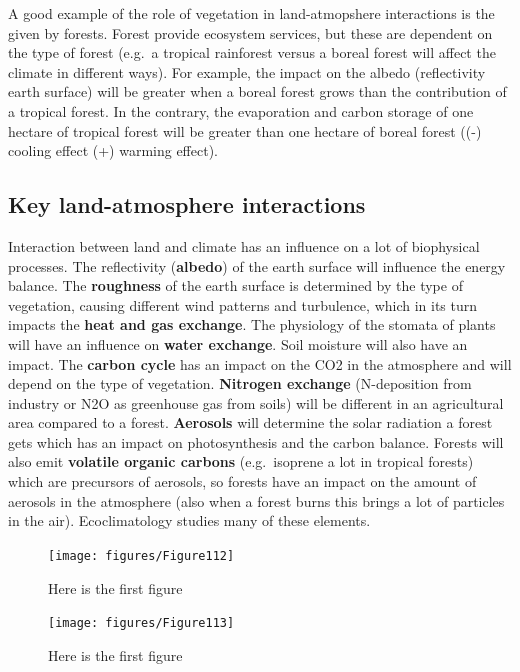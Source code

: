 \documentclass[oneside]{book}
\begin{document}
A good example of the role of vegetation in land-atmopshere interactions
is the given by forests. Forest provide ecosystem services, but these
are dependent on the type of forest (e.g.~a tropical rainforest versus a
boreal forest will affect the climate in different ways). For example,
the impact on the albedo (reflectivity earth surface) will be greater
when a boreal forest grows than the contribution of a tropical forest.
In the contrary, the evaporation and carbon storage of one hectare of
tropical forest will be greater than one hectare of boreal forest ((-)
cooling effect (+) warming effect).

\subsection{Key land-atmosphere
interactions}\label{key-land-atmosphere-interactions}

Interaction between land and climate has an influence on a lot of
biophysical processes. The reflectivity (\textbf{albedo}) of the earth
surface will influence the energy balance. The \textbf{roughness} of the
earth surface is determined by the type of vegetation, causing different
wind patterns and turbulence, which in its turn impacts the \textbf{heat
and gas exchange}. The physiology of the stomata of plants will have an
influence on \textbf{water exchange}. Soil moisture will also have an
impact. The \textbf{carbon cycle} has an impact on the CO2 in the
atmosphere and will depend on the type of vegetation. \textbf{Nitrogen
exchange} (N-deposition from industry or N2O as greenhouse gas from
soils) will be different in an agricultural area compared to a forest.
\textbf{Aerosols} will determine the solar radiation a forest gets which
has an impact on photosynthesis and the carbon balance. Forests will
also emit \textbf{volatile organic carbons} (e.g.~isoprene a lot in
tropical forests) which are precursors of aerosols, so forests have an
impact on the amount of aerosols in the atmosphere (also when a forest
burns this brings a lot of particles in the air). Ecoclimatology studies
many of these elements.

\begin{figure}

{\centering \texttt{[image: figures/Figure112]} 

}

\caption{Here is the first figure}\label{fig:Land}
\end{figure}

\begin{figure}

{\centering \texttt{[image: figures/Figure113]} 

}

\caption{Here is the first figure}\label{fig:Land2}
\end{figure}
\end{document}
